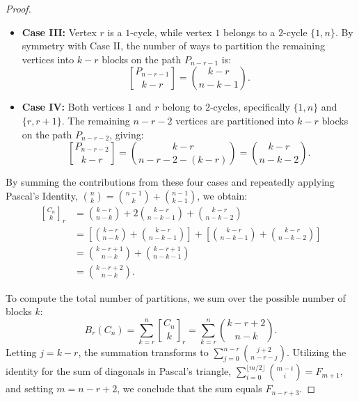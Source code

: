 \documentclass[10pt,a4paper]{amsart}
\begin{document}
\begin{proof}
\begin{itemize}
    \item \textbf{Case III:} Vertex $r$ is a $1$-cycle, while vertex $1$ belongs to a $2$-cycle $\{1, n\}$. 
    By symmetry with Case II, the number of ways to partition the remaining vertices into $k-r$ blocks on the path $P_{n-r-1}$ is:
    \begin{equation*}
        {P_{n-r-1} \brack k-r} = \binom{k-r}{n-k-1}.
    \end{equation*}

    \item \textbf{Case IV:} Both vertices $1$ and $r$ belong to $2$-cycles, specifically $\{1, n\}$ and $\{r, r+1\}$. 
    The remaining $n-r-2$ vertices are partitioned into $k-r$ blocks on the path $P_{n-r-2}$, giving:
    \begin{equation*}
        {P_{n-r-2} \brack k-r} = \binom{k-r}{n-r-2-(k-r)} = \binom{k-r}{n-k-2}.
    \end{equation*}
\end{itemize}

By summing the contributions from these four cases and repeatedly applying Pascal's Identity, $\binom{n}{k} = \binom{n-1}{k} + \binom{n-1}{k-1}$, we obtain:
\begin{align*}
    {C_n \brack k}_r &= \binom{k-r}{n-k} + 2\binom{k-r}{n-k-1} + \binom{k-r}{n-k-2} \\
    &= \left[ \binom{k-r}{n-k} + \binom{k-r}{n-k-1} \right] + \left[ \binom{k-r}{n-k-1} + \binom{k-r}{n-k-2} \right] \\
    &= \binom{k-r+1}{n-k} + \binom{k-r+1}{n-k-1} \\
    &= \binom{k-r+2}{n-k}.
\end{align*}

To compute the total number of partitions, we sum over the possible number of blocks $k$:
\begin{equation*}
      B_r(C_n)= \sum_{k=r}^n {C_n \brack k}_r = \sum_{k=r}^n \binom{k-r+2}{n-k}.
\end{equation*}
Letting $j = k-r$, the summation transforms to $\sum_{j=0}^{n-r} \binom{j+2}{n-r-j}$. Utilizing the identity for the sum of diagonals in Pascal's triangle, $\sum_{i=0}^{\lfloor m/2 \rfloor} \binom{m-i}{i} = F_{m+1}$, and setting $m = n-r+2$, we conclude that the sum equals $F_{n-r+3}$.
\end{proof}
\end{document}
